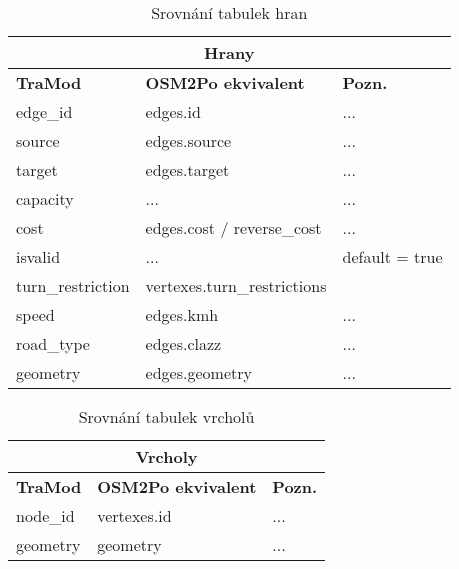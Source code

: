 \begin{table}[]
\centering
\begin{tabular}{|lll|}
\hline
\multicolumn{3}{|c|}{\textbf{Hrany}}                                                                            \\ \hline
\multicolumn{1}{|l|}{\textbf{TraMod}} & \multicolumn{1}{l|}{\textbf{OSM2Po ekvivalent}}  & \textbf{Pozn.}  \\ \hline
\multicolumn{1}{|l|}{edge\_id}              & \multicolumn{1}{l|}{edges.id}                    & ...            \\ \hline
\multicolumn{1}{|l|}{source}                & \multicolumn{1}{l|}{edges.source}                & ...            \\ \hline
\multicolumn{1}{|l|}{target}                & \multicolumn{1}{l|}{edges.target}                & ...            \\ \hline
\multicolumn{1}{|l|}{capacity}              & \multicolumn{1}{l|}{...}                         & ...            \\ \hline
\multicolumn{1}{|l|}{cost}                  & \multicolumn{1}{l|}{edges.cost / reverse\_cost}  & ...            \\ \hline
\multicolumn{1}{|l|}{isvalid}               & \multicolumn{1}{l|}{...}                         & default = true \\ \hline
\multicolumn{1}{|l|}{turn\_restriction}     & \multicolumn{1}{l|}{vertexes.turn\_restrictions} &                \\ \hline
\multicolumn{1}{|l|}{speed}                 & \multicolumn{1}{l|}{edges.kmh}                   & ...            \\ \hline
\multicolumn{1}{|l|}{road\_type}            & \multicolumn{1}{l|}{edges.clazz}                 & ...            \\ \hline
\multicolumn{1}{|l|}{geometry}              & \multicolumn{1}{l|}{edges.geometry}              & ...            \\ \hline
\end{tabular}
\caption{Srovnání tabulek hran}
\end{table}
\vspace{20pt}
\begin{table}[]
\centering
\begin{tabular}{|lll|}
\hline
\multicolumn{3}{|c|}{\textbf{Vrcholy}}                                                                   \\ \hline
\multicolumn{1}{|l|}{\textbf{TraMod}} & \multicolumn{1}{l|}{\textbf{OSM2Po ekvivalent}} & \textbf{Pozn.} \\ \hline
\multicolumn{1}{|l|}{node\_id}        & \multicolumn{1}{l|}{vertexes.id}                & ...            \\ \hline
\multicolumn{1}{|l|}{geometry}        & \multicolumn{1}{l|}{geometry}                   & ...            \\ \hline
\end{tabular}
\caption{Srovnání tabulek vrcholů}
\end{table}
\vspace{10pt}



